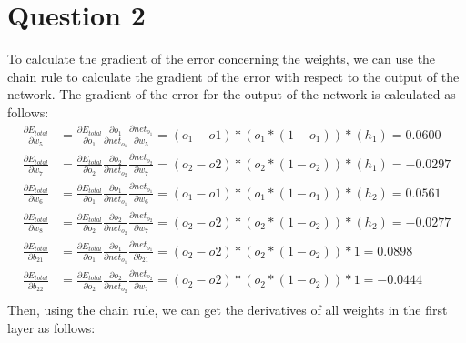 \documentclass[12pt,a4paper]{article}
\begin{document}
\section{Question 2}
To calculate the gradient of the error concerning the weights, we can use the chain rule to calculate the gradient of the error with respect to the output of the network. The gradient of the error for the output of the network is calculated as follows:
\begin{align*}
    \frac{\partial E_{total}}{\partial w_5} &= \frac{\partial E_{total}}{\partial o_1}  \frac{\partial o_1}{\partial net_{o_1}}   \frac{\partial net_{o_1}}{\partial w_5} =  (o_1 - o1) * (o_1 * (1 - o_1)) * (h_1) = 0.0600\\
    \frac{\partial E_{total}}{\partial w_7} &= \frac{\partial E_{total}}{\partial o_2}  \frac{\partial o_2}{\partial net_{o_2}}   \frac{\partial net_{o_2}}{\partial w_7} =  (o_2 - o2) * (o_2 * (1 - o_2)) * (h_1) = -0.0297\\
    \frac{\partial E_{total}}{\partial w_6} &= \frac{\partial E_{total}}{\partial o_1}  \frac{\partial o_1}{\partial net_{o_1}}   \frac{\partial net_{o_1}}{\partial w_6} =  (o_1 - o1) * (o_1 * (1 - o_1)) * (h_2) = 0.0561\\
    \frac{\partial E_{total}}{\partial w_8} &= \frac{\partial E_{total}}{\partial o_2}  \frac{\partial o_2}{\partial net_{o_2}}   \frac{\partial net_{o_2}}{\partial w_7} =  (o_2 - o2) * (o_2 * (1 - o_2)) * (h_2) = -0.0277\\
    \frac{\partial E_{total}}{\partial b_{21}} &= \frac{\partial E_{total}}{\partial o_1}  \frac{\partial o_1}{\partial net_{o_1}}   \frac{\partial net_{o_1}}{\partial b_{21}} =  (o_2 - o2) * (o_2 * (1 - o_2)) * 1 = 0.0898\\
    \frac{\partial E_{total}}{\partial b_{22}} &= \frac{\partial E_{total}}{\partial o_2}  \frac{\partial o_2}{\partial net_{o_2}}   \frac{\partial net_{o_2}}{\partial w_7} =  (o_2 - o2) * (o_2 * (1 - o_2)) * 1 = -0.0444\\
\end{align*}
Then, using the chain rule, we can get the derivatives of all weights in the first layer as follows:
\end{document}
